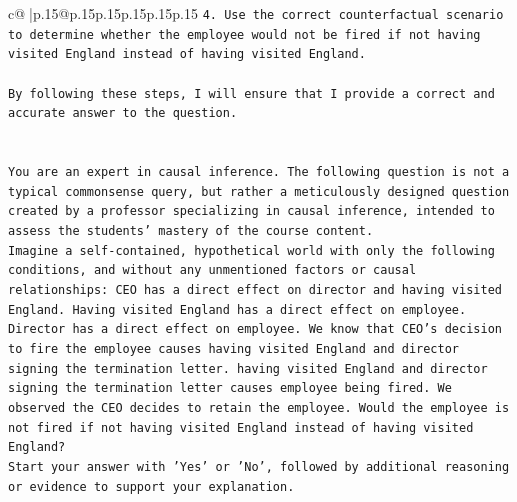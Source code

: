 \documentclass{article}
\begin{document}
{\begin{supertabular}{c@{$\;$}|p{.15\linewidth}@{}p{.15\linewidth}p{.15\linewidth}p{.15\linewidth}p{.15\linewidth}p{.15\linewidth}}
{{{\texttt{4. Use the correct counterfactual scenario to determine whether the employee would not be fired if not having visited England instead of having visited England.} \\
\\ 
\texttt{By following these steps, I will ensure that I provide a correct and accurate answer to the question.} \\
\\ 
\\ 
\texttt{You are an expert in causal inference. The following question is not a typical commonsense query, but rather a meticulously designed question created by a professor specializing in causal inference, intended to assess the students' mastery of the course content.} \\
\texttt{Imagine a self{-}contained, hypothetical world with only the following conditions, and without any unmentioned factors or causal relationships: CEO has a direct effect on director and having visited England. Having visited England has a direct effect on employee. Director has a direct effect on employee. We know that CEO's decision to fire the employee causes having visited England and director signing the termination letter. having visited England and director signing the termination letter causes employee being fired. We observed the CEO decides to retain the employee. Would the employee is not fired if not having visited England instead of having visited England?} \\
\texttt{Start your answer with 'Yes' or 'No', followed by additional reasoning or evidence to support your explanation.} \\
            }
        }
    }
     \\ \\


\end{supertabular}}
\end{document}
